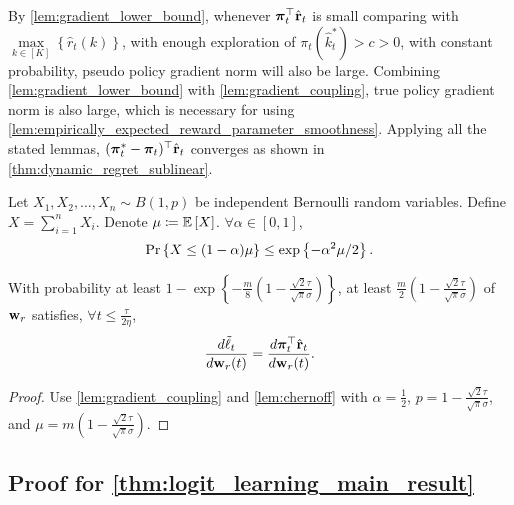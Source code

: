 By \cref{lem:gradient_lower_bound}, whenever ${\boldsymbol{\pi}}_t^\top \hat{{\mathbf{r}}}_t$ is small comparing with $\max\limits_{k \in \left[K\right]}\left\{ \hat{r}_{t}(k) \right\}$, with enough exploration of $\pi_{t}(\hat{k}_t^*) > c > 0$, with constant probability, pseudo policy gradient norm will also be large. Combining \cref{lem:gradient_lower_bound} with \cref{lem:gradient_coupling}, true policy gradient norm is also large, which is necessary for using \cref{lem:empirically_expected_reward_parameter_smoothness}. Applying all the stated lemmas, $( {\boldsymbol{\pi}}_t^* - {\boldsymbol{\pi}}_t)^\top \hat{{\mathbf{r}}}_t$ converges as shown in \cref{thm:dynamic_regret_sublinear}.

\begin{lem}[Chernoff]
\label{lem:chernoff}
    Let $X_1, X_2, \dots, X_n \sim B(1, p)$ be independent Bernoulli random variables. Define $X = \sum\limits_{i=1}^{n}{ X_i  }$. Denote $\mu \coloneqq {\mathbb{E}}\left[ X \right]$. $\forall \alpha \in [0,1]$,
\begin{equation*}
    \operatorname*{Pr}\left\{ X \le (1 - \alpha) \mu \right\} \le \exp\left\{ - \alpha^2 \mu / 2 \right\}.
\end{equation*}
\end{lem}

\begin{lem}
\label{lem:gradient_coupling_in_total}
With probability at least $1 - \exp\left\{ - \frac{m}{8} \left( 1 - \frac{\sqrt{2}\tau}{\sqrt{\pi}\sigma} \right) \right\}$, at least $\frac{m}{2}\left( 1 - \frac{\sqrt{2}\tau}{\sqrt{\pi}\sigma} \right) $ of ${\mathbf{w}}_r$ satisfies, $\forall t \le \frac{\tau}{ 2 \eta }$,
\begin{equation*}
	\frac{d\tilde{\ell}_t}{d {\mathbf{w}}_r(t)} = \frac{d {\boldsymbol{\pi}}_t^\top \hat{{\mathbf{r}}}_t}{d {\mathbf{w}}_r(t)}.
\end{equation*}
\end{lem}
\begin{proof}
Use \cref{lem:gradient_coupling} and \cref{lem:chernoff} with $\alpha = \frac{1}{2}$, $p = 1 - \frac{\sqrt{2}\tau}{\sqrt{\pi}\sigma}$, and $\mu = m \left( 1 - \frac{\sqrt{2}\tau}{\sqrt{\pi}\sigma} \right)$.
\end{proof}

\subsection{Proof for \cref{thm:logit_learning_main_result}}

